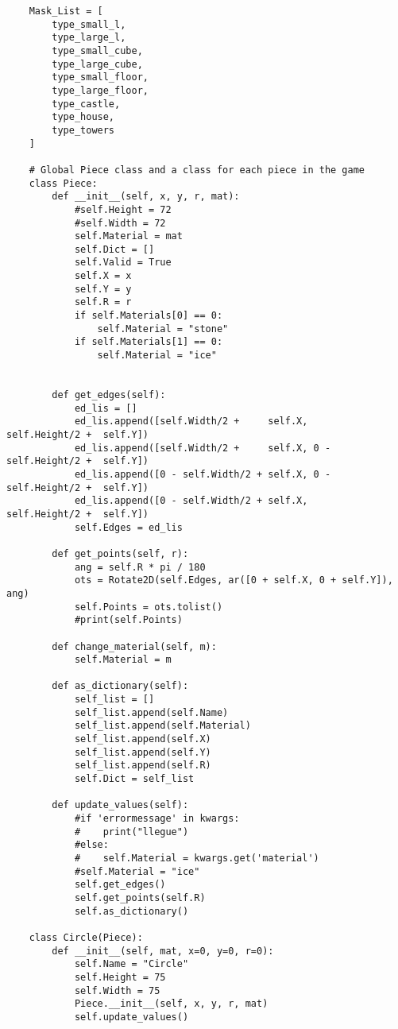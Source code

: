 \begin{verbatim}
    Mask_List = [
        type_small_l,
        type_large_l,
        type_small_cube,
        type_large_cube,
        type_small_floor,
        type_large_floor,
        type_castle,
        type_house,
        type_towers
    ]

    # Global Piece class and a class for each piece in the game
    class Piece:
        def __init__(self, x, y, r, mat):
            #self.Height = 72
            #self.Width = 72
            self.Material = mat
            self.Dict = []
            self.Valid = True
            self.X = x
            self.Y = y
            self.R = r
            if self.Materials[0] == 0:
                self.Material = "stone"
            if self.Materials[1] == 0:
                self.Material = "ice"
            
        
        def get_edges(self):
            ed_lis = []
            ed_lis.append([self.Width/2 +     self.X,      self.Height/2 +  self.Y])
            ed_lis.append([self.Width/2 +     self.X, 0 -  self.Height/2 +  self.Y])
            ed_lis.append([0 - self.Width/2 + self.X, 0 -  self.Height/2 +  self.Y])
            ed_lis.append([0 - self.Width/2 + self.X,      self.Height/2 +  self.Y])
            self.Edges = ed_lis

        def get_points(self, r):
            ang = self.R * pi / 180
            ots = Rotate2D(self.Edges, ar([0 + self.X, 0 + self.Y]), ang)
            self.Points = ots.tolist()
            #print(self.Points)

        def change_material(self, m):
            self.Material = m

        def as_dictionary(self):
            self_list = []
            self_list.append(self.Name)
            self_list.append(self.Material)
            self_list.append(self.X)
            self_list.append(self.Y)
            self_list.append(self.R)
            self.Dict = self_list
            
        def update_values(self):
            #if 'errormessage' in kwargs:
            #    print("llegue")
            #else: 
            #    self.Material = kwargs.get('material')
            #self.Material = "ice"
            self.get_edges()
            self.get_points(self.R)
            self.as_dictionary()

    class Circle(Piece):
        def __init__(self, mat, x=0, y=0, r=0):
            self.Name = "Circle"
            self.Height = 75
            self.Width = 75
            Piece.__init__(self, x, y, r, mat)
            self.update_values()


\end{verbatim}
